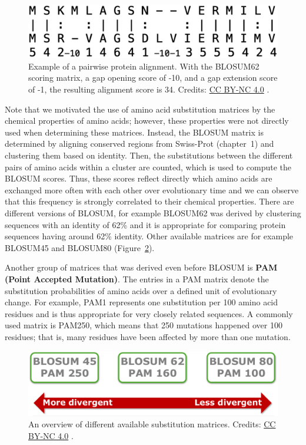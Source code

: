 \begin{figure}[!htbp]
\centering
\includegraphics[width=1\linewidth]{files/aa_alg-cf3f1a5e13f7346c86c1b95980331ff4.png}
\caption[]{Example of a pairwise protein alignment.
With the BLOSUM62 scoring matrix, a gap opening score of -10, and a gap extension score of -1, the resulting alignment score is 34.
Credits: \href{https://creativecommons.org/licenses/by-nc/4.0/}{CC BY-NC 4.0} \cite{own_2_2024}.}
\label{aa_alg}
\end{figure}

Note that we motivated the use of amino acid substitution matrices by the chemical properties of amino acids; however, these properties were not directly used when determining these matrices.
Instead, the BLOSUM matrix is determined by aligning conserved regions from Swiss-Prot (chapter~1) and clustering them based on identity.
Then, the substitutions between the different pairs of amino acids within a cluster are counted, which is used to compute the BLOSUM scores.
Thus, these scores reflect directly which amino acids are exchanged more often with each other over evolutionary time and we can observe that this frequency is strongly correlated to their chemical properties.
There are different versions of BLOSUM, for example BLOSUM62 was derived by clustering sequences with an identity of 62\% and it is appropriate for comparing protein sequences having around 62\% identity.
Other available matrices are for example BLOSUM45 and BLOSUM80 (Figure~\ref{submat}).

Another group of matrices that was derived even before BLOSUM is \textbf{PAM (Point Accepted Mutation)}.
The entries in a PAM matrix denote the substitution probabilities of amino acids over a defined unit of evolutionary change.
For example, PAM1 represents one substitution per 100 amino acid residues and is thus appropriate for very closely related sequences.
A commonly used matrix is PAM250, which means that 250 mutations happened over 100 residues; that is, many residues have been affected by more than one mutation.

\begin{figure}[!htbp]
\centering
\includegraphics[width=0.8\linewidth]{files/submat-50e39b907c3803a8ca0b3f7fe7f14a07.pdf}
\caption[]{An overview of different available substitution matrices.
Credits: \href{https://creativecommons.org/licenses/by-nc/4.0/}{CC BY-NC 4.0} \cite{own_2_2024}.}
\label{submat}
\end{figure}

